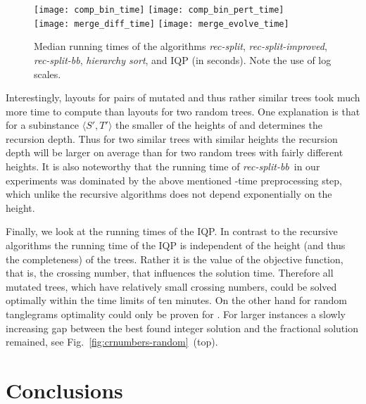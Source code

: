 \documentclass[runningheads,a4paper]{llncs}
\newcommand{\ttree}[1]{\ensuremath{\langle #1 \rangle}}
\newcommand{\recsplit}{\emph{rec-split}}
\newcommand{\recimproved}{\emph{rec-split-improved}}
\newcommand{\recbb}{\emph{rec-split-bb}}
\newcommand{\hiersort}{\emph{hierarchy sort}}
\begin{document}
\begin{figure}[tb]
  \centering
  \texttt{[image: comp\_bin\_time]}
  \hfill
  \texttt{[image: comp\_bin\_pert\_time]}\\
  \texttt{[image: merge\_diff\_time]}
  \hfill
  \texttt{[image: merge\_evolve\_time]}
  \caption{Median running times of the algorithms \recsplit, \recimproved,
    \recbb, \hiersort, and IQP (in seconds).  Note the use of log scales.}
  \label{fig:times}
  \vspace{-4ex}
\end{figure}

Interestingly, layouts for pairs of mutated and thus rather similar
trees took much more time to compute than layouts for two random
trees. One explanation is that for a subinstance \ttree{S',T'} the
smaller of the heights of  and  determines the recursion
depth. Thus for two similar trees with similar heights the recursion
depth will be larger on average than for two random trees with fairly
different heights. It is also noteworthy that the running time of
\recbb\ in our experiments was dominated by the above mentioned -time preprocessing step, which unlike the recursive algorithms
does not depend exponentially on the height.

Finally, we look at the running times of the IQP. In contrast to the
recursive algorithms the running time of the IQP is independent of the
height (and thus the completeness) of the trees. Rather it is the
value of the objective function, that is, the crossing number, that influences the solution time. Therefore all
mutated trees, which have relatively small crossing numbers, could be
solved optimally within the time limits of ten minutes. On the other
hand for random tanglegrams optimality could only be proven for .
For larger instances a slowly increasing gap between the best found integer solution and the fractional
solution remained, see Fig.~\ref{fig:crnumbers-random}~(top).

\section{Conclusions}
\end{document}
